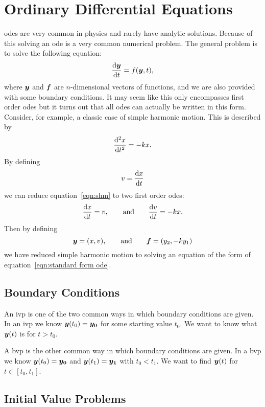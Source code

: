 \documentclass[a4paper]{article}
\begin{document}
    \section{Ordinary Differential Equations}
    \Glspl{ode} are very common in physics and rarely have analytic solutions.
    Because of this solving an \gls{ode} is a very common numerical problem.
    The general problem is to solve the following equation:
    \begin{equation}\label{eqn:standard form ode}
        \dv{\bm{y}}{t} = f(\bm{y}, t),
    \end{equation}
    where \(\bm{y}\) and \(\bm{f}\) are \(n\)-dimensional vectors of functions, and we are also provided with some boundary conditions.
    It may seem like this only encompasses first order \glspl{ode} but it turns out that all \glspl{ode} can actually be written in this form.
    Consider, for example, a classic case of simple harmonic motion.
    This is described by
    \begin{equation}\label{eqn:shm}
        \dv[2]{x}{t} = -kx.
    \end{equation}
    By defining 
    \[v = \dv{x}{t}\]
    we can reduce equation~\ref{eqn:shm} to two first order \glspl{ode}:
    \[\dv{x}{t} = v,\qquad\text{and}\qquad \dv{v}{t} = -kx.\]
    Then by defining
    \[\bm{y} = (x, v), \qquad\text{and}\qquad \bm{f} = (y_2, -ky_1)\]
    we have reduced simple harmonic motion to solving an equation of the form of equation~\ref{eqn:standard form ode}.
    
    \subsection{Boundary Conditions}
    An \gls{ivp} is one of the two common ways in which boundary conditions are given.
    In an \gls{ivp} we know \(\bm{y}(t_0) = \bm{y_0}\) for some starting value \(t_0\).
    We want to know what \(\bm{y}(t)\) is for \(t > t_0\).
    
    A \gls{bvp} is the other common way in which boundary conditions are given.
    In a \gls{bvp} we know \(\bm{y}(t_0) = \bm{y_0}\) and \(\bm{y}(t_1) = \bm{y_1}\) with \(t_0 < t_1\).
    We want to find \(\bm{y}(t)\) for \(t \in [t_0, t_1]\).
    
    \subsection{Initial Value Problems}
\end{document}
